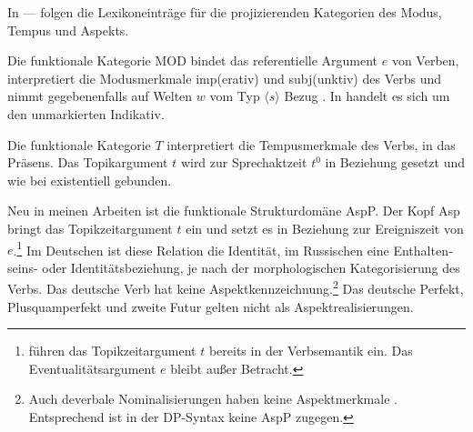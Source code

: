 \documentclass[output=paper, colorlinks, citecolor=brown, booklanguage=german]{langscibook}
\begin{document}
\begin{otherlanguage}{german}
In — folgen die Lexikoneinträge für die projizierenden Kategorien des Modus, Tempus und Aspekts.

\largerpage[2]
\ea \label{ex:18:18}
	\ea{ \label{ex:18:18a} $\varnothing$
    }
	\z
\z

\noindent Die funktionale Kategorie MOD bindet das referentielle Argument $e$ von Verben, interpretiert die Modusmerkmale imp(erativ) und subj(unktiv) des Verbs und nimmt gegebenenfalls auf Welten $w$ vom Typ $\langle s\rangle$ Bezug \citep{Zimmermann2009,Zimmermann2013,Zimmermann2015a,Zimmermann2016}. In  handelt es sich um den unmarkierten Indikativ.

\ea \label{ex:18:19}
	\ea{ \label{ex:18:19a} $\varnothing$
    }
	\z
\z

\noindent Die funktionale Kategorie $T$ interpretiert die Tempusmerkmale des Verbs, in  das Präsens. Das Topikargument $t$ wird zur Sprechaktzeit $t^0$ in Beziehung gesetzt und wie bei \citeauthor{Gronn-Stechow2010} existentiell gebunden.

\ea \label{ex:18:20}
	\ea{ \label{ex:18:20a} $\varnothing$
    }
	\z
\z

\noindent Neu in meinen Arbeiten ist die funktionale Strukturdomäne AspP. Der Kopf Asp bringt das Topikzeitargument $t$ ein und setzt es in Beziehung zur Ereigniszeit von $e$.\footnote{\label{fn:18:4} \citeauthor{Gronn-Stechow2010} führen das Topikzeitargument $t$ bereits in der Verbsemantik ein. Das Eventualitätsargument $e$ bleibt außer Betracht.} Im Deutschen ist diese Relation die Identität, im Russischen eine Ent\-hal\-ten\-seins- oder Identitätsbeziehung, je nach der morphologischen Kategorisierung des Verbs. Das deutsche Verb hat keine Aspektkennzeichnung.\footnote{\label{fn:18:5}Auch deverbale Nominalisierungen haben keine Aspektmerkmale \citep{Tatevosov2015}. Entsprechend ist in der DP-Syntax keine AspP zugegen.} Das deutsche Perfekt, Plus\-quam\-per\-fekt und zweite Futur gelten nicht als Aspektrealisierungen.


\end{otherlanguage}
\end{document}
